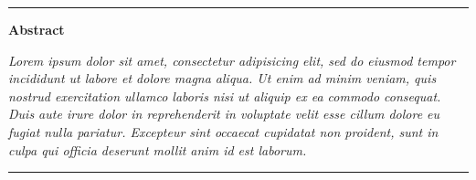 \documentclass{stdlocal}
\begin{document}
\bigskip
\hrule
\smallskip
  \begin{center}
    \textbf{Abstract}
  \end{center}
  \itshape
  \hspace{10pt}
  Lorem ipsum dolor sit amet, consectetur adipisicing elit, sed do eiusmod
  tempor incididunt ut labore et dolore magna aliqua. Ut enim ad minim veniam,
  quis nostrud exercitation ullamco laboris nisi ut aliquip ex ea commodo
  consequat. Duis aute irure dolor in reprehenderit in voluptate velit esse
  cillum dolore eu fugiat nulla pariatur. Excepteur sint occaecat cupidatat non
  proident, sunt in culpa qui officia deserunt mollit anim id est laborum.
\bigskip
\hrule
\bigskip
\end{document}
